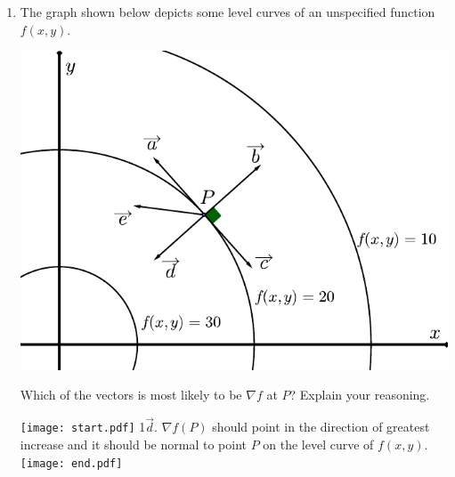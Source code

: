 \documentclass[12pt]{article}
\begin{document}
\begin{enumerate}
\item The graph shown below depicts some level curves of an unspecified function $f(x,y)$.  

\begin{center}
\includegraphics[scale=0.9]{gradient.pdf}
\end{center}

Which of the vectors is most likely to be $\nabla f$ at $P$?  Explain your reasoning.

\texttt{[image: start.pdf]}
{{{1\linewidth}{$\overrightarrow{d}$.  $\nabla f (P)$ should point in the direction of greatest increase and it should be normal to point $P$ on the level curve of $f(x,y)$.}}}
\texttt{[image: end.pdf]}


\end{enumerate}
\end{document}
